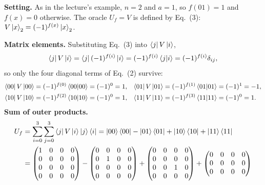 \documentclass[a4paper, 10pt]{article}
\begin{document}
\begin{solution}
	\noindent \textbf{Setting.} As in the lecture's example, \( n = 2 \) and \( a = 1 \), so \( f(01) = 1 \) and \( f(x) = 0 \) otherwise. The oracle \( U_f = V \) is defined by Eq.~(3): \( V\ket{x}_2 = (-1)^{f(x)}\ket{x}_2 \).

	\myspace

	\noindent \textbf{Matrix elements.} Substituting Eq.~(3) into \( \bra{j}V\ket{i} \),
	\[
		\bra{j}V\ket{i} = \bra{j}(-1)^{f(i)}\ket{i} = (-1)^{f(i)}\braket{j \vert i} = (-1)^{f(i)}\delta_{ij},
	\]
	so only the four diagonal terms of Eq.~(2) survive:
	\begin{align*}
		\bra{00}V\ket{00} & = (-1)^{f(0)}\braket{00 \vert 00} = (-1)^0 = 1,  &
		\bra{01}V\ket{01} & = (-1)^{f(1)}\braket{01 \vert 01} = (-1)^1 = -1,   \\
		\bra{10}V\ket{10} & = (-1)^{f(2)}\braket{10 \vert 10} = (-1)^0 = 1,  &
		\bra{11}V\ket{11} & = (-1)^{f(3)}\braket{11 \vert 11} = (-1)^0 = 1 .
	\end{align*}
	\noindent \textbf{Sum of outer products.}
	\begin{align*}
		U_f & = \sum_{i = 0}^{3}\sum_{j = 0}^{3}\bra{j}V\ket{i}\ket{j}\bra{i}
		= \ket{00}\bra{00} - \ket{01}\bra{01} + \ket{10}\bra{10} + \ket{11}\bra{11} \\
		    & = \begin{pmatrix}
			        1 & 0 & 0 & 0 \\
			        0 & 0 & 0 & 0 \\
			        0 & 0 & 0 & 0 \\
			        0 & 0 & 0 & 0
		        \end{pmatrix}
		- \begin{pmatrix}
			  0 & 0 & 0 & 0 \\
			  0 & 1 & 0 & 0 \\
			  0 & 0 & 0 & 0 \\
			  0 & 0 & 0 & 0
		  \end{pmatrix}
		+ \begin{pmatrix}
			  0 & 0 & 0 & 0 \\
			  0 & 0 & 0 & 0 \\
			  0 & 0 & 1 & 0 \\
			  0 & 0 & 0 & 0
		  \end{pmatrix}
		+ \begin{pmatrix}
			  0 & 0 & 0 & 0 \\
			  0 & 0 & 0 & 0 \\
			  0 & 0 & 0 & 0 \\

\end{pmatrix}
\end{align*}
\end{solution}
\end{document}
